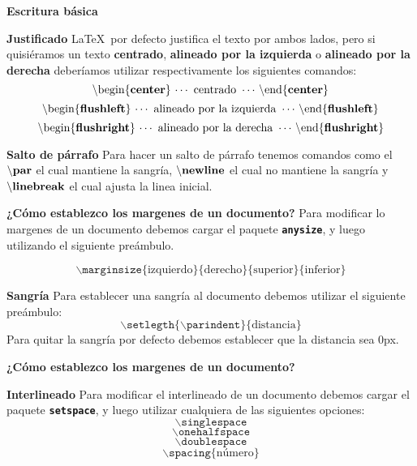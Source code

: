 \documentclass[aspectratio=169]{beamer}
\begin{document}
\begin{frame}{\bf Escritura básica}
\begin{alertblock}{\bf Justificado}
\LaTeX\ por defecto justifica el texto por ambos lados, pero si quisiéramos un texto \textbf{centrado}, \textbf{alineado por la izquierda} o \textbf{alineado por la derecha} deberíamos utilizar respectivamente los siguientes comandos:
$$\backslash\text{begin}\{\text{\bf center}\}\,\cdots\text{ centrado }\cdots\,\backslash\text{end}\{\text{\bf center}\}$$
$$\backslash\text{begin}\{\text{\bf flushleft}\}\,\cdots\text{ alineado por la izquierda }\cdots\,\backslash\text{end}\{\text{\bf flushleft}\}$$
$$\backslash\text{begin}\{\text{\bf flushright}\}\,\cdots\text{ alineado por la derecha }\cdots\,\backslash\text{end}\{\text{\bf flushright}\}$$
\end{alertblock}
\begin{alertblock}{\bf Salto de párrafo}
Para hacer un salto de párrafo tenemos comandos como el $\backslash\texttt{\bf par}$ el cual mantiene la sangría, $\backslash\texttt{\bf newline}$ el cual no mantiene la sangría y $\backslash\texttt{\bf linebreak}$ el cual ajusta la linea inicial.

\end{alertblock}
\end{frame}

\begin{frame}{\bf ¿Cómo establezco los margenes de un documento?}
Para modificar lo margenes de un documento debemos cargar el paquete \texttt{\bf anysize}, y luego utilizando el siguiente preámbulo.

$$\backslash\texttt{marginsize}\{\text{izquierdo}\}\{\text{derecho}\}\{\text{superior}\}\{\text{inferior}\}$$

\begin{alertblock}{\bf Sangría}
Para establecer una sangría al documento debemos utilizar el siguiente preámbulo:
$$\backslash\texttt{setlegth}\{\backslash\texttt{parindent}\}\{\text{distancia}\}$$
Para quitar la sangría por defecto debemos establecer que la distancia sea 0px.
\end{alertblock}
\end{frame}

\begin{frame}{\bf ¿Cómo establezco los margenes de un documento?}
\begin{alertblock}{\bf Interlineado}
Para modificar el interlineado de un documento debemos cargar el paquete \texttt{\bf setspace}, y luego utilizar cualquiera de las siguientes opciones:
$$\backslash\texttt{singlespace}$$
$$\backslash\texttt{onehalfspace}$$
$$\backslash\texttt{doublespace}$$
$$\backslash\texttt{spacing}\{\text{número}\}$$
\end{alertblock}
\end{frame}
\end{document}
